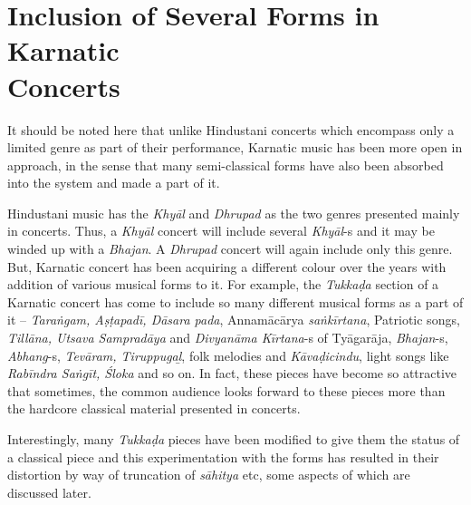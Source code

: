 \vspace{-.3cm}

\section*{Inclusion of Several Forms in Karnatic\\ Concerts}

\vspace{-.2cm}

It should be noted here that unlike Hindustani concerts which encompass only a limited genre as part of their performance, Karnatic music has been more open in approach, in the sense that many semi-classical forms have also been absorbed into the system and made a part of it.

Hindustani music has the \textit{Khyāl} and \textit{Dhrupad} as the two genres presented mainly in concerts. Thus, a \textit{Khyāl} concert will include several \textit{Khyāl}-s and it may be winded up with a \textit{Bhajan}. A \textit{Dhrupad} concert will again include only this genre. But, Karnatic concert has been acquiring a different colour over the years with addition of various musical forms to it. For example, the \textit{Tukkaḍa} section of a Karnatic concert has come to include so many different musical forms as a part of it – \textit{Taraṅgam, Aṣṭapadī, Dāsara pada}, Annamācārya \textit{saṅkīrtana}, Patriotic songs, \textit{Tillāna, Utsava Sampradāya} and \textit{Divyanāma Kīrtana}-s of Tyāgarāja, \textit{Bhajan}-s, \textit{Abhang}-s, \textit{Tevāram, Tiruppugaḻ}, folk melodies and \textit{Kāvaḍicindu}, light songs like \textit{Rabīndra Saṅgīt, Śloka} and so on. In fact, these pieces have become so attractive that sometimes, the common audience looks forward to these pieces more than the hardcore classical material presented in concerts.

Interestingly, many \textit{Tukkaḍa} pieces have been modified to give them the status of a classical piece and this experimentation with the forms has resulted in their distortion by way of truncation of \textit{sāhitya} etc, some aspects of which are discussed later.

